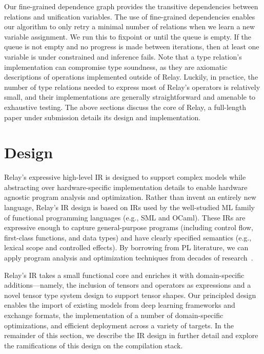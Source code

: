   Our fine-grained dependence graph provides the transitive dependencies
    between relations and unification variables.
  The use of fine-grained dependencies enables our algorithm to
    only retry a minimal number of relations when we
    learn a new variable assignment.
  We run this to fixpoint or until the queue is empty.
  If the queue is not empty and no progress is made between iterations,
    then at least one variable is under constrained and inference fails.
  Note that a type relation's implementation can
    compromise type soundness, as they are axiomatic descriptions
    of operations implemented outside of Relay.
  Luckily, in practice, the number of type relations needed to express most of Relay's
    operators is relatively small, and their implementations are generally straightforward
    and amenable to exhaustive testing.
The above sections discuss the core of Relay, a full-length paper under submission\citep{roesch2019relay}
  details its design and implementation.

  \section{Design}

  Relay's expressive high-level IR is designed to support
    complex models while abstracting over hardware-specific
    implementation details to enable hardware agnostic program
    analysis and optimization.
  Rather than invent an entirely new language,
    Relay's IR design is based on IRs used by the well-studied ML family of
    functional programming languages (e.g., SML and OCaml).
  These IRs are expressive enough to capture general-purpose programs
    (including control flow, first-class functions, and data types)
    and have clearly specified semantics (e.g., lexical scope and controlled effects).
  By borrowing from PL literature,
    we can apply program analysis and optimization techniques from decades of research~\citep{haskell_vector}.

  Relay's IR takes a small functional core and enriches it with domain-specific additions---namely,
    the inclusion of tensors and operators as expressions
    and a novel tensor type system design to support tensor shapes.
  Our principled design
    enables the import of existing models from deep learning frameworks and exchange formats,
    the implementation of a number of domain-specific optimizations,
    and efficient deployment across a variety of targets.
  In the remainder of this section,
    we describe the IR design in further detail
    and explore the ramifications of this design on the compilation stack.

